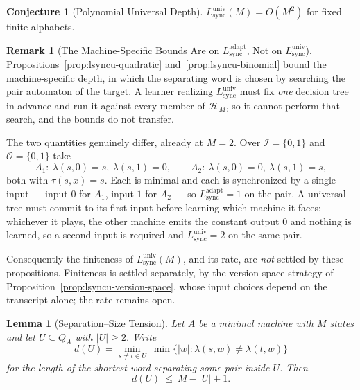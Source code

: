 \documentclass[12pt]{article}
\newtheorem{lemma}[theorem]{Lemma}
\theoremstyle{definition}
\newtheorem{remark}[theorem]{Remark}
\newtheorem{conjecture}[theorem]{Conjecture}
\newcommand{\Lsync}{L_{\mathrm{sync}}^{\mathrm{adapt}}}
\newcommand{\Lsyncu}{L_{\mathrm{sync}}^{\mathrm{univ}}}
\begin{document}
\begin{conjecture}[Polynomial Universal Depth]
\label{conj:lsyncu-poly}
$\Lsyncu(M)=O(M^2)$ for fixed finite alphabets.
\end{conjecture}

\begin{remark}[The Machine-Specific Bounds Are on $\Lsync$, Not on $\Lsyncu$]
\label{rem:lsync-not-lsyncu}
Propositions~\ref{prop:lsyncu-quadratic} and~\ref{prop:lsyncu-binomial} bound
the machine-specific depth, in which the separating word is chosen by searching
the pair automaton of the target.  A learner realizing $\Lsyncu$ must fix
\emph{one} decision tree in advance and run it against every member of
$\mathcal H_M$, so it cannot perform that search, and the bounds do not
transfer.

The two quantities genuinely differ, already at $M=2$.  Over
$\mathcal I=\{0,1\}$ and $\mathcal O=\{0,1\}$ take
\[
A_1:\ \lambda(s,0)=s,\ \lambda(s,1)=0,
\qquad
A_2:\ \lambda(s,0)=0,\ \lambda(s,1)=s,
\]
both with $\tau(s,x)=s$.  Each is minimal and each is synchronized by a single
input --- input $0$ for $A_1$, input $1$ for $A_2$ --- so
$\Lsync=1$ on the pair.  A universal tree must commit to its first input before
learning which machine it faces; whichever it plays, the other machine emits
the constant output $0$ and nothing is learned, so a second input is required
and $\Lsyncu=2$ on the same pair.

Consequently the finiteness of $\Lsyncu(M)$, and its rate, are \emph{not}
settled by these propositions.  Finiteness is settled separately, by the
version-space strategy of Proposition~\ref{prop:lsyncu-version-space}, whose
input choices depend on the transcript alone; the rate remains open.
\end{remark}

\begin{lemma}[Separation--Size Tension]
\label{lem:tension}
Let $A$ be a minimal machine with $M$ states and let $U\subseteq Q_A$ with
$|U|\ge2$.  Write
\[
d(U)=\min_{s\ne t\in U}\ \min\{|w| : \lambda(s,w)\ne\lambda(t,w)\}
\]
for the length of the shortest word separating some pair inside $U$.  Then
\[
d(U)\ \le\ M-|U|+1 .
\]
\end{lemma}
\end{document}
